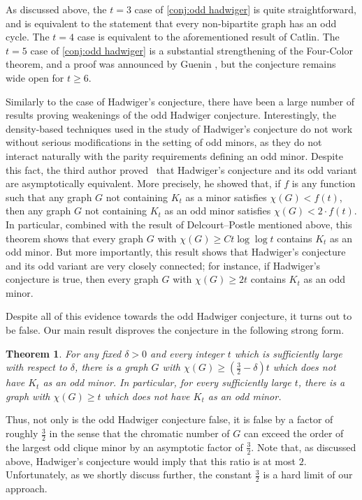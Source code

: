 \documentclass[11pt,reqno,oneside]{amsart}
\newtheorem{theorem}{Theorem}[section]
\theoremstyle{definition}
\newcommand\1{\mathbf{1}}
\let\geq\geqslant
\begin{document}
As discussed above, the $t=3$ case of \cref{conj:odd hadwiger} is quite straightforward, and is equivalent to the statement that every non-bipartite graph has an odd cycle. The $t=4$ case is equivalent to the aforementioned result of Catlin. The $t=5$ case of \cref{conj:odd hadwiger} is a substantial strengthening of the Four-Color theorem, and a proof was announced by Guenin \cite{MR2164877}, but the conjecture remains wide open for $t\geq 6$.

Similarly to the case of Hadwiger's conjecture, there have been a large number of results \cite{MR698708,MR2467815,MR2518204,MR4426767,2010.05999,fracoddhadwiger,oddclustered1,oddclustered2,oddclustered3,clusteredodd,topoddhadwiger,topoddhadwiger2} proving weakenings of the odd Hadwiger conjecture. Interestingly, the density-based techniques used in the study of Hadwiger's conjecture do not work without serious modifications in the setting of odd minors, as they do not interact naturally with the parity requirements defining an odd minor. Despite this fact, the third author proved~\cite{MR4379303} that Hadwiger's conjecture and its odd variant are asymptotically equivalent. More precisely, he showed that, if $f$ is any function such that any graph $G$ not containing $K_t$ as a minor satisfies $\chi(G)< f(t)$, then any graph $G$ not containing $K_t$ as an odd minor satisfies $\chi(G) < 2\cdot f(t)$. In particular, combined with the result of Delcourt--Postle \cite{MR4868948} mentioned above, this theorem shows that every graph $G$ with $\chi(G)\geq Ct\log \log t$ contains $K_t$ as an odd minor. But more importantly, this result shows that Hadwiger's conjecture and its odd variant are very closely connected; for instance, if Hadwiger's conjecture is true, then every graph $G$ with $\chi(G) \geq 2t$ contains $K_t$ as an odd minor.

Despite all of this evidence towards the odd Hadwiger conjecture, it turns out to be false. Our main result disproves the conjecture in the following strong form.

\begin{theorem}\label{thm:main}
	For any fixed $\delta>0$ and every integer $t$ which is sufficiently large with respect to $\delta$, there is a graph $G$ with $\chi(G) \geq (\frac 32 -\delta)t$ which does not have $K_t$ as an odd minor. In particular, for every sufficiently large $t$, there is a graph with $\chi(G)\geq t$ which does not have $K_t$ as an odd minor.
\end{theorem}
Thus, not only is the odd Hadwiger conjecture false, it is false by a factor of roughly $\frac 32$ in the sense that the chromatic number of $G$ can exceed the order of the largest odd clique minor by an asymptotic factor of $\frac 32$. Note that, as discussed above, Hadwiger's conjecture would imply that this ratio is at most $2$. Unfortunately, as we shortly discuss further, the constant $\frac 32$ is a hard limit of our approach.
\end{document}
